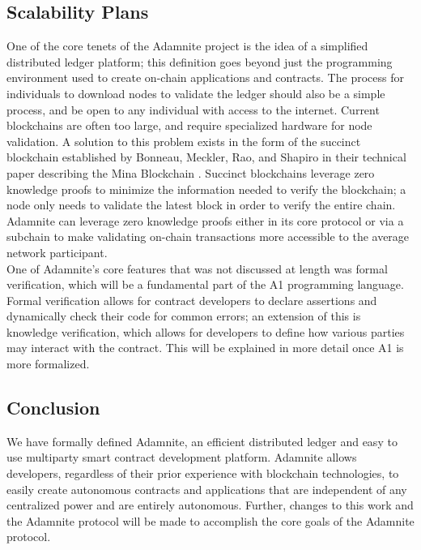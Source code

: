 \documentclass[conference]{IEEEtran}
\begin{document}
\subsection{Scalability Plans}
One of the core tenets of the Adamnite project is the idea of a simplified distributed ledger platform; this definition goes beyond just the programming environment used to create on-chain applications and contracts. The process for individuals to download nodes to validate the ledger should also be a simple process, and be open to any individual with access to the internet. Current blockchains are often too large, and require specialized hardware for node validation. A solution to this problem exists in the form of the succinct blockchain established by Bonneau, Meckler, Rao, and Shapiro in their technical paper describing the Mina Blockchain \cite{bonneau2020Mina}. Succinct blockchains leverage zero knowledge proofs to minimize the information needed to verify the blockchain; a node only needs to validate the latest block in order to verify the entire chain. Adamnite can leverage zero knowledge proofs either in its core protocol or via a subchain to make validating on-chain transactions more accessible to the average network participant.\\
One of Adamnite's core features that was not discussed at length was formal verification, which will be a fundamental part of the A1 programming language. Formal verification allows for contract developers to declare assertions and dynamically check their code for common errors; an extension of this is knowledge verification, which allows for developers to define how various parties may interact with the contract. This will be explained in more detail once A1 is more formalized.

\subsection{Conclusion}
We have formally defined Adamnite, an efficient distributed ledger and easy to use multiparty smart contract development platform. Adamnite allows developers, regardless of their prior experience with blockchain technologies, to easily create autonomous contracts and applications that are independent of any centralized power and are entirely autonomous. Further, changes to this work and the Adamnite protocol will be made to accomplish the core goals of the Adamnite protocol. 
\end{document}
